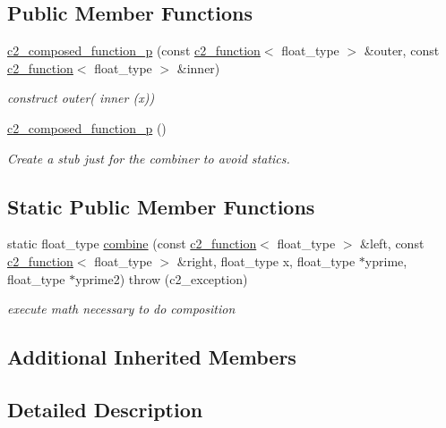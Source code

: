 \subsection*{Public Member Functions}
\begin{DoxyCompactItemize}
\item 
\hyperlink{classc2__composed__function__p_a45b7f7de47d2c363d51aa4f953e85edf}{c2\+\_\+composed\+\_\+function\+\_\+p} (const \hyperlink{classc2__function}{c2\+\_\+function}$<$ float\+\_\+type $>$ \&outer, const \hyperlink{classc2__function}{c2\+\_\+function}$<$ float\+\_\+type $>$ \&inner)
\begin{DoxyCompactList}\small\item\em construct {\itshape outer}( {\itshape inner} (x)) \end{DoxyCompactList}\item 
\hyperlink{classc2__composed__function__p_a5a1db2d4db6b02e054034452be85be06}{c2\+\_\+composed\+\_\+function\+\_\+p} ()
\begin{DoxyCompactList}\small\item\em Create a stub just for the combiner to avoid statics. \end{DoxyCompactList}\end{DoxyCompactItemize}
\subsection*{Static Public Member Functions}
\begin{DoxyCompactItemize}
\item 
static float\+\_\+type \hyperlink{classc2__composed__function__p_a9431a8977df47ca1fde4a4ba92525781}{combine} (const \hyperlink{classc2__function}{c2\+\_\+function}$<$ float\+\_\+type $>$ \&left, const \hyperlink{classc2__function}{c2\+\_\+function}$<$ float\+\_\+type $>$ \&right, float\+\_\+type x, float\+\_\+type $\ast$yprime, float\+\_\+type $\ast$yprime2)  throw (c2\+\_\+exception)
\begin{DoxyCompactList}\small\item\em execute math necessary to do composition \end{DoxyCompactList}\end{DoxyCompactItemize}
\subsection*{Additional Inherited Members}


\subsection{Detailed Description}
